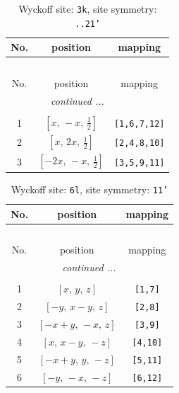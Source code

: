 \documentclass[fleqn,8pt]{jsarticle}
\begin{document}
\begin{longtable}{ccc}
\caption{Wyckoff site: {\tt 3k}, site symmetry: {\tt ..21'}}
 \\
 \hline \hline
No. & position & mapping \\ \hline \endfirsthead

\multicolumn{2}{l}{\tablename\ \thetable{}} \\
 \hline \hline
No. & position & mapping \\ \hline \endhead

 \hline \hline
\multicolumn{2}{r}{\footnotesize\it continued ...} \\ \endfoot

 \hline \hline
\multicolumn{2}{r}{} \\ \endlastfoot

1 & $\left[ x,\, - x,\, \frac{1}{2} \right]$ & {\tt [1,6,7,12]} \\ \hline
2 & $\left[ x,\, 2 x,\, \frac{1}{2} \right]$ & {\tt [2,4,8,10]} \\ \hline
3 & $\left[ - 2 x,\, - x,\, \frac{1}{2} \right]$ & {\tt [3,5,9,11]} \\
\end{longtable}
\renewcommand{\arraystretch}{1.2}
\begin{longtable}{ccc}
\caption{Wyckoff site: {\tt 6l}, site symmetry: {\tt 11'}}
 \\
 \hline \hline
No. & position & mapping \\ \hline \endfirsthead

\multicolumn{2}{l}{\tablename\ \thetable{}} \\
 \hline \hline
No. & position & mapping \\ \hline \endhead

 \hline \hline
\multicolumn{2}{r}{\footnotesize\it continued ...} \\ \endfoot

 \hline \hline
\multicolumn{2}{r}{} \\ \endlastfoot

1 & $\left[ x,\, y,\, z \right]$ & {\tt [1,7]} \\ \hline
2 & $\left[ - y,\, x - y,\, z \right]$ & {\tt [2,8]} \\ \hline
3 & $\left[ - x + y,\, - x,\, z \right]$ & {\tt [3,9]} \\ \hline
4 & $\left[ x,\, x - y,\, - z \right]$ & {\tt [4,10]} \\ \hline
5 & $\left[ - x + y,\, y,\, - z \right]$ & {\tt [5,11]} \\ \hline
6 & $\left[ - y,\, - x,\, - z \right]$ & {\tt [6,12]} \\
\end{longtable}
\end{document}
